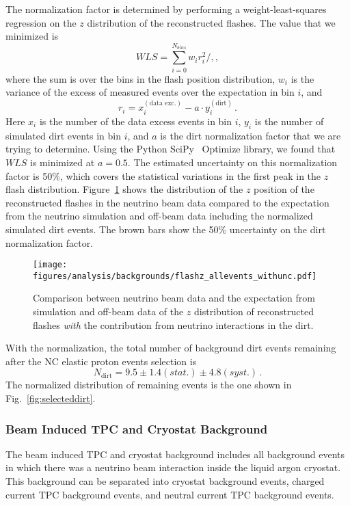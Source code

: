     The normalization factor is determined by performing a weight-least-squares
    regression on the $z$ distribution of the reconstructed flashes. The value
    that we minimized is
    \begin{equation*}
      WLS = \sum_{i=0}^{N_{bins}} w_i r_i^2 /,,
    \end{equation*}
    where the sum is over the bins in the flash position distribution, $w_i$ is
    the variance of the excess of measured events over the expectation in bin
    $i$, and
    \begin{equation*}
      r_i = x_i^{(\textrm{data exc.})} - a\cdot y_i^{(\textrm{dirt})} \,.
    \end{equation*}
    Here $x_i$ is the number of the data excess events in bin $i$, $y_i$ is the
    number of simulated dirt events in bin $i$, and $a$ is the dirt
    normalization factor that we are trying to determine. Using the Python
    SciPy~\cite{SciPy} Optimize library, we found that $WLS$ is minimized at $a
    = 0.5$. The estimated uncertainty on this normalization factor is 50\%,
    which covers the statistical variations in the first peak in the $z$ flash
    distribution. Figure~\ref{fig:flashwithdirt} shows the distribution of the
    $z$ position of the reconstructed flashes in the neutrino beam data
    compared to the expectation from the neutrino simulation and off-beam data
    including the normalized simulated dirt events. The brown bars show the
    50\% uncertainty on the dirt normalization factor.
    \begin{figure}[ht]
      \centering
      \texttt{[image: figures/analysis/backgrounds/flashz\_allevents\_withunc.pdf]}
      \caption{Comparison between neutrino beam data and the expectation from
      simulation and off-beam data of the $z$ distribution of reconstructed
      flashes \textit{with} the contribution from neutrino interactions in
      the dirt.}
      \label{fig:flashwithdirt}
    \end{figure}

    With the normalization, the total number of background dirt events
    remaining after the NC elastic proton events selection is
    \begin{equation*}
     N_{\textrm{dirt}} = 9.5 \pm 1.4(stat.) \pm 4.8 (syst.) \,. 
    \end{equation*}
    The normalized distribution of remaining events is the one shown in
    Fig.~\ref{fig:selecteddirt}.

  \subsubsection{Beam Induced TPC and Cryostat Background}
    The beam induced TPC and cryostat background includes all background events
    in which there was a neutrino beam interaction inside the liquid argon
    cryostat. This background can be separated into cryostat background events,
    charged current TPC background events, and neutral current TPC background
    events.
    
